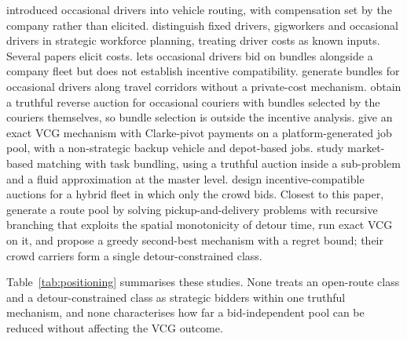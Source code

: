 \documentclass[review,12pt]{elsarticle}
\theoremstyle{definition}
\theoremstyle{remark}
\begin{document}
\citet{archetti2016vrpod} introduced occasional drivers into vehicle
routing, with compensation set by the company rather than elicited.
\citet{luy2024workforce} distinguish fixed drivers, gigworkers and
occasional drivers in strategic workforce planning, treating driver costs
as known inputs. Several papers elicit costs. \citet{triki2021combinatorial}
lets occasional drivers bid on bundles alongside a company fleet but
does not establish incentive compatibility.
\citet{mancini2022bundle} generate bundles for occasional drivers along
travel corridors without a private-cost mechanism. \citet{chen2023truthful}
obtain a truthful reverse auction for occasional couriers with bundles
selected by the couriers themselves, so bundle selection is outside the
incentive analysis. \citet{zou2022mechanisms} give an exact VCG mechanism
with Clarke-pivot payments on a platform-generated job pool, with a
non-strategic backup vehicle and depot-based jobs. \citet{oyama2025market}
study market-based matching with task bundling, using a truthful auction
inside a sub-problem and a fluid approximation at the master level.
\citet{xu2026incentive} design incentive-compatible auctions for a hybrid
fleet in which only the crowd bids. Closest to this paper,
\citet{li2026auction} generate a route pool by solving pickup-and-delivery
problems with recursive branching that exploits the spatial monotonicity
of detour time, run exact VCG on it, and propose a greedy second-best
mechanism with a regret bound; their crowd carriers form a single
detour-constrained class.

Table~\ref{tab:positioning} summarises these studies. None treats an
open-route class and a detour-constrained class as strategic bidders
within one truthful mechanism, and none characterises how far a
bid-independent pool can be reduced without affecting the VCG outcome.
\end{document}
